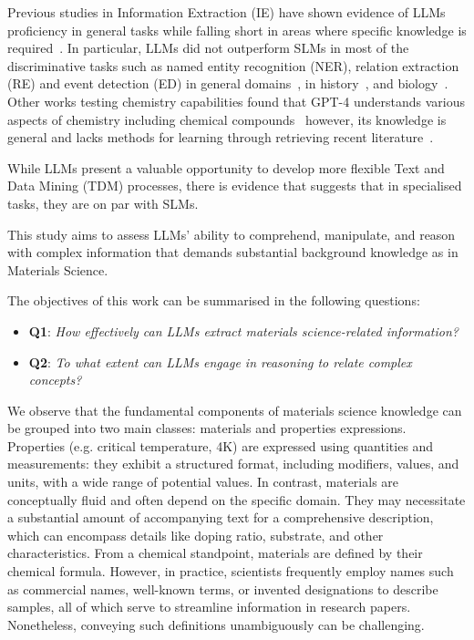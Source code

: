 \documentclass[a4paper]{article}
\begin{document}
Previous studies in Information Extraction (IE) have shown evidence of LLMs proficiency in general tasks while falling short in areas where specific knowledge is required~\cite{kokon2023chatgpt}. 
In particular, LLMs did not outperform SLMs in most of the discriminative tasks such as named entity recognition (NER), relation extraction (RE) and event detection (ED) in general domains~\cite{ma2023large}, in history~\cite{gonzalez2023yes}, and biology~\cite{moradi2022gpt3}.
Other works testing chemistry capabilities found that GPT-4 understands various aspects of chemistry including chemical compounds~\cite{hatakeyama2023prompt} however, its knowledge is general and lacks methods for learning through retrieving recent literature~\cite{hatakeyama2023using}.

While LLMs present a valuable opportunity to develop more flexible Text and Data Mining (TDM) processes, there is evidence that suggests that in specialised tasks, they are on par with SLMs. 

This study aims to assess LLMs' ability to comprehend, manipulate, and reason with complex information that demands substantial background knowledge as in Materials Science. 

The objectives of this work can be summarised in the following questions: 
\begin{itemize}
    \item \textbf{Q1}: \textit{How effectively can LLMs extract materials science-related information?}
    \item \textbf{Q2}: \textit{To what extent can LLMs engage in reasoning to relate complex concepts?}
\end{itemize}

We observe that the fundamental components of materials science knowledge can be grouped into two main classes: materials and properties expressions. 
Properties (e.g. critical temperature, 4K) are expressed using quantities and measurements: they exhibit a structured format, including modifiers, values, and units, with a wide range of potential values. 
In contrast, materials are conceptually fluid and often depend on the specific domain. They may necessitate a substantial amount of accompanying text for a comprehensive description, which can encompass details like doping ratio, substrate, and other characteristics. 
From a chemical standpoint, materials are defined by their chemical formula. 
However, in practice, scientists frequently employ names such as commercial names, well-known terms, or invented designations to describe samples, all of which serve to streamline information in research papers. Nonetheless, conveying such definitions unambiguously can be challenging.
\end{document}
